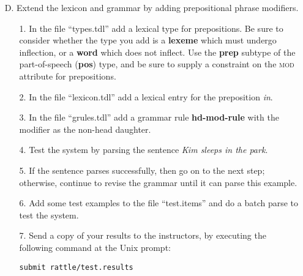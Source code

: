 \documentclass[10pt]{article}
\begin{document}
\begin{itemize}
\begin{itemize}
\end{itemize}
\item[D.] Extend the lexicon and grammar by adding prepositional phrase modifiers.
\begin{itemize}
\item[1.] In the file ``types.tdl'' add a lexical type for prepositions.  Be sure to consider whether the type you add is a \textbf{lexeme} which must undergo inflection, or a \textbf{word} which does not inflect.  Use the \textbf{prep} subtype of the part-of-speech (\textbf{pos}) type, and be sure to supply a constraint on the \textsc{mod} attribute for prepositions. 
\item[2.] In the file ``lexicon.tdl'' add a lexical entry for the preposition \emph{in}.
\item[3.] In the file ``grules.tdl'' add a grammar rule \textbf{hd-mod-rule} with the modifier as the non-head daughter.
\item[4.] Test the system by parsing the sentence \emph{Kim sleeps in the park}.
\item[5.] If the sentence parses successfully, then go on to the next step; otherwise, continue to revise the grammar until it can parse this example.
\item[6.] Add some test examples to the file ``test.items'' and do a batch parse to test the system.
\item[7.] Send a copy of your results to the instructors, by executing the
following command at the Unix prompt:
\par\texttt{submit rattle/test.results}
\end{itemize}

\end{itemize}
\end{document}
